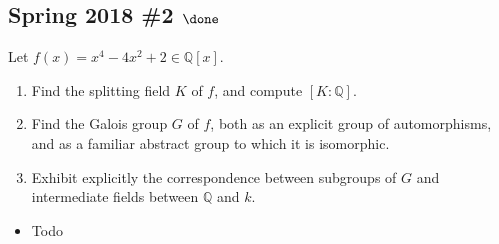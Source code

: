 \hypertarget{spring-2018-2-done}{%
\subsection{\texorpdfstring{Spring 2018 \#2
\(\done\)}{Spring 2018 \#2 \textbackslash done}}\label{spring-2018-2-done}}

Let \(f(x) = x^4 - 4x^2 + 2 \in {\mathbb{Q}}[x]\).

\begin{enumerate}
\def\labelenumi{\alph{enumi}.}
\item
  Find the splitting field \(K\) of \(f\), and compute
  \([K: {\mathbb{Q}}]\).
\item
  Find the Galois group \(G\) of \(f\), both as an explicit group of
  automorphisms, and as a familiar abstract group to which it is
  isomorphic.
\item
  Exhibit explicitly the correspondence between subgroups of \(G\) and
  intermediate fields between \({\mathbb{Q}}\) and \(k\).
\end{enumerate}


\begin{concept}

\envlist

\begin{itemize}
\tightlist
\item
  Todo
\end{itemize}

\end{concept}

